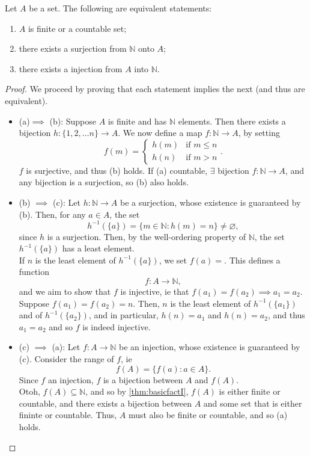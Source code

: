 \documentclass[12pt]{article}
\begin{document}
\begin{proposition}\label{prop:equivcountable}
  Let $A$ be a set. The following are equivalent statements:
  \begin{enumerate}[label=(\alph*)]
    \item $A$ is finite or a countable set;
    \item there exists a surjection from $\mathbb{N}$ onto $A$;
    \item there exists a injection from $A$ into $\mathbb{N}$.
  \end{enumerate}
\end{proposition}

\begin{proof}
  We proceed by proving that each statement implies the next (and thus are equivalent).
  \begin{itemize}
    \item  (a)$ \implies$ (b): Suppose $A$ is finite and has $\mathbb{N}$ elements. Then there exists a bijection $h :\{1,2,\dots n\} \to A$. We now define a map $f: \mathbb{N} \to A$, by setting $$f(m) = \begin{cases}
      h(m) & \text{if } m \leq n\\
      h(n) & \text{if } m > n
    \end{cases}.$$
    $f$ is surjective, and thus (b) holds.
    If (a) countable, $\exists$ bijection $f : \mathbb{N} \to A$, and any bijection is a surjection, so (b) also holds.
    \item (b) $\implies$ (c): Let $h: \mathbb{N} \to A$ be a surjection, whose existence is guaranteed by (b). Then, for any $a \in A$, the set $$h^{-1}(\{a\}) = \{m \in \mathbb{N}: h(m) = n\} \neq \varnothing,$$ since $h$ is a surjection. Then, by the well-ordering property of $\mathbb{N}$, the set $h^{-1}(\{a\})$ has a least element.\\
    If $n$ is the least element of $h^{-1}(\{a\})$, we set $f(a) = $. This defines a function \[f: A \to \mathbb{N},\] and we aim to show that $f$ is injective, ie that $f(a_1) = f(a_2) \implies a_1 = a_2$.\\
    Suppose $f(a_1) = f(a_2) = n$. Then, $n$ is the least element of $h^{-1}(\{a_1\})$ and of $h^{-1}(\{a_2\})$, and in particular, $h(n) = a_1$ and $h(n) = a_2$, and thus $a_1 = a_2$ and so $f$ is indeed injective.

    \item (c) $\implies$ (a): Let $f: A \to \mathbb{N}$ be an injection, whose existence is guaranteed by (c). Consider the range of $f$, ie \[f(A) = \{f(a) : a \in A\}.\] Since $f$ an injection, $f$ is a bijection between $A$ and $f(A)$.\\
    Otoh, $f(A) \subseteq \mathbb{N}$, and so by \cref{thm:basicfactI}, $f(A)$ is either finite or countable, and there exists a bijection between $A$ and some set that is either fininte or countable. Thus, $A$ must also be finite or countable, and so (a) holds.
  \end{itemize}
\end{proof}
\end{document}
